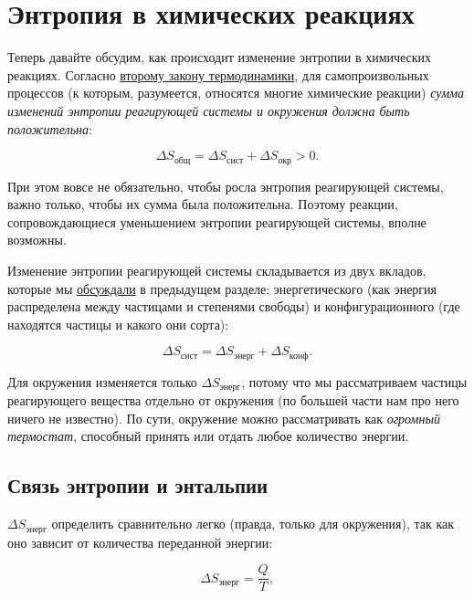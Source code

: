 \clearpage

\section{Энтропия в химических реакциях}

Теперь давайте обсудим, как происходит изменение энтропии в химических реакциях. Согласно \hyperref[term:second_law_of_thermodynamics]{второму закону термодинамики}, для самопроизвольных процессов (к которым, разумеется, относятся многие химические реакции) \emph{сумма изменений энтропии реагирующей системы и окружения должна быть положительна}:

\begin{equation*}
    \boxed{\Delta S_{\text{общ}} = \Delta S_{\text{сист}} + \Delta S_{\text{окр}} > 0}.
\end{equation*}

При этом вовсе не обязательно, чтобы росла энтропия реагирующей системы, важно только, чтобы их сумма была положительна. Поэтому реакции, сопровождающиеся уменьшением энтропии реагирующей системы, вполне возможны.

Изменение энтропии реагирующей системы складывается из двух вкладов, которые мы \hyperref[tab:microstates]{обсуждали} в предыдущем разделе: энергетического (как энергия распределена между частицами и степенями свободы) и конфигурационного (где находятся частицы и какого они сорта):

\begin{equation*}
    \boxed{\Delta S_{\text{сист}} = \Delta S_{\text{энерг}} + \Delta S_{\text{конф}}}.
\end{equation*}

Для окружения изменяется только $\Delta S_{\text{энерг}}$, потому что мы рассматриваем частицы реагирующего вещества отдельно от окружения (по большей части нам про него ничего не известно). По сути, окружение можно рассматривать как \emph{огромный термостат}, способный принять или отдать любое количество энергии.

\subsection*{Связь энтропии и энтальпии}

$\Delta S_{\text{энерг}}$ определить сравнительно легко (правда, только для окружения), так как оно зависит от количества переданной энергии:

\begin{equation*}
    \Delta S_{\text{энерг}} = \frac{Q}{T},
\end{equation*}

